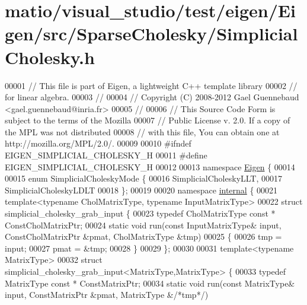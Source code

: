 \hypertarget{matio_2visual__studio_2test_2eigen_2_eigen_2src_2_sparse_cholesky_2_simplicial_cholesky_8h_source}{}\section{matio/visual\+\_\+studio/test/eigen/\+Eigen/src/\+Sparse\+Cholesky/\+Simplicial\+Cholesky.h}
\label{matio_2visual__studio_2test_2eigen_2_eigen_2src_2_sparse_cholesky_2_simplicial_cholesky_8h_source}

\begin{DoxyCode}
00001 \textcolor{comment}{// This file is part of Eigen, a lightweight C++ template library}
00002 \textcolor{comment}{// for linear algebra.}
00003 \textcolor{comment}{//}
00004 \textcolor{comment}{// Copyright (C) 2008-2012 Gael Guennebaud <gael.guennebaud@inria.fr>}
00005 \textcolor{comment}{//}
00006 \textcolor{comment}{// This Source Code Form is subject to the terms of the Mozilla}
00007 \textcolor{comment}{// Public License v. 2.0. If a copy of the MPL was not distributed}
00008 \textcolor{comment}{// with this file, You can obtain one at http://mozilla.org/MPL/2.0/.}
00009 
00010 \textcolor{preprocessor}{#ifndef EIGEN\_SIMPLICIAL\_CHOLESKY\_H}
00011 \textcolor{preprocessor}{#define EIGEN\_SIMPLICIAL\_CHOLESKY\_H}
00012 
00013 \textcolor{keyword}{namespace }\hyperlink{namespace_eigen}{Eigen} \{ 
00014 
00015 \textcolor{keyword}{enum} SimplicialCholeskyMode \{
00016   SimplicialCholeskyLLT,
00017   SimplicialCholeskyLDLT
00018 \};
00019 
00020 \textcolor{keyword}{namespace }\hyperlink{namespaceinternal}{internal} \{
00021   \textcolor{keyword}{template}<\textcolor{keyword}{typename} CholMatrixType, \textcolor{keyword}{typename} InputMatrixType>
00022   \textcolor{keyword}{struct }simplicial\_cholesky\_grab\_input \{
00023     \textcolor{keyword}{typedef} CholMatrixType \textcolor{keyword}{const} * ConstCholMatrixPtr;
00024     \textcolor{keyword}{static} \textcolor{keywordtype}{void} run(\textcolor{keyword}{const} InputMatrixType& input, ConstCholMatrixPtr &pmat, CholMatrixType &tmp)
00025     \{
00026       tmp = input;
00027       pmat = &tmp;
00028     \}
00029   \};
00030   
00031   \textcolor{keyword}{template}<\textcolor{keyword}{typename} MatrixType>
00032   \textcolor{keyword}{struct }simplicial\_cholesky\_grab\_input<MatrixType,MatrixType> \{
00033     \textcolor{keyword}{typedef} MatrixType \textcolor{keyword}{const} * ConstMatrixPtr;
00034     \textcolor{keyword}{static} \textcolor{keywordtype}{void} run(\textcolor{keyword}{const} MatrixType& input, ConstMatrixPtr &pmat, MatrixType &\textcolor{comment}{/*tmp*/})

\end{DoxyCode}
